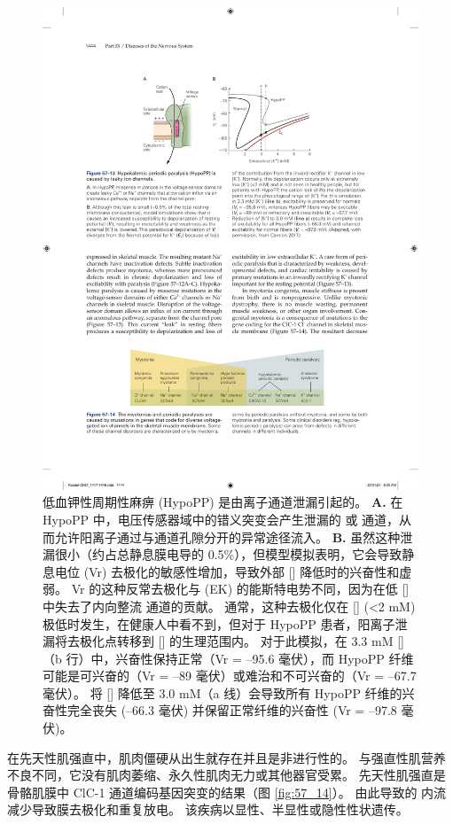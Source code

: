 \begin{figure}[htbp]
	\centering
	\includegraphics[width=0.6\linewidth]{chap57/fig_57_13}
	\caption{低血钾性周期性麻痹 (HypoPP) 是由离子通道泄漏引起的。
		\textbf{A.} 在 HypoPP 中，电压传感器域中的错义突变会产生泄漏的  或  通道，从而允许阳离子通过与通道孔隙分开的异常途径流入。
		\textbf{B.} 虽然这种泄漏很小（约占总静息膜电导的 0.5\%），但模型模拟表明，它会导致静息电位 (Vr) 去极化的敏感性增加，导致外部 [] 降低时的兴奋性和虚弱。
		Vr 的这种反常去极化与  (EK) 的能斯特电势不同，因为在低 [] 中失去了内向整流  通道的贡献。
		通常，这种去极化仅在 [] (<2 mM) 极低时发生，在健康人中看不到，但对于 HypoPP 患者，阳离子泄漏将去极化点转移到 [] 的生理范围内。
		对于此模拟，在 3.3 mM []（b 行）中，兴奋性保持正常（Vr = –95.6 毫伏），而 HypoPP 纤维可能是可兴奋的（Vr = –89 毫伏）或难治和不可兴奋的（Vr = –67.7 毫伏）。
		将 [] 降低至 3.0 mM（a 线）会导致所有 HypoPP 纤维的兴奋性完全丧失 (–66.3 毫伏) 并保留正常纤维的兴奋性 (Vr = –97.8 毫伏)\cite{cannon2018sodium}。}
	\label{fig:57_13}
\end{figure}


在先天性肌强直中，肌肉僵硬从出生就存在并且是非进行性的。
与强直性肌营养不良不同，它没有肌肉萎缩、永久性肌肉无力或其他器官受累。
先天性肌强直是骨骼肌膜中 ClC-1  通道编码基因突变的结果（图 \ref{fig:57_14}）。
由此导致的  内流减少导致膜去极化和重复放电。
该疾病以显性、半显性或隐性性状遗传。


